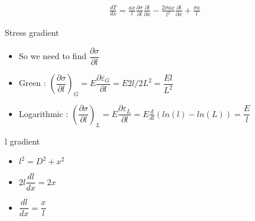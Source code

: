 	\begin{frame}
		\begin{align*}
		\frac{dT}{dx} = \frac{ax}{l}\frac{\partial \sigma}{\partial l} \frac{\partial l}{\partial x} -\frac{2\sigma ax}{l^2}\frac{\partial l}{\partial x } + \frac{\sigma a}{l}
		\end{align*}
		\begin{block}{Stress gradient}
			\begin{itemize}
				\item So we need to find $\dfrac{\partial \sigma}{\partial l}$
				
				\item Green : $\left(\dfrac{\partial \sigma}{\partial l} \right)_G = E \dfrac{\partial \varepsilon_G}{\partial l} = E2l/2L^2 = \dfrac{El}{L^2}$
				
				\item Logarithmic : $\left(\dfrac{\partial \sigma}{\partial l} \right)_L = E \dfrac{\partial \varepsilon_L}{\partial l} = E \frac{d}{dl}\left(ln(l) - ln(L) \right) =  \dfrac{E}{l}$		
			\end{itemize}
		\end{block}
		\begin{block}{l gradient}
			\begin{itemize}
				\item $l^2 = D^2 + x^2$	
				\item $2l \dfrac{dl}{dx} = 2x$
				\item $\dfrac{dl}{dx} = \dfrac{x}{l}$
			\end{itemize}
		\end{block}
	\end{frame}

